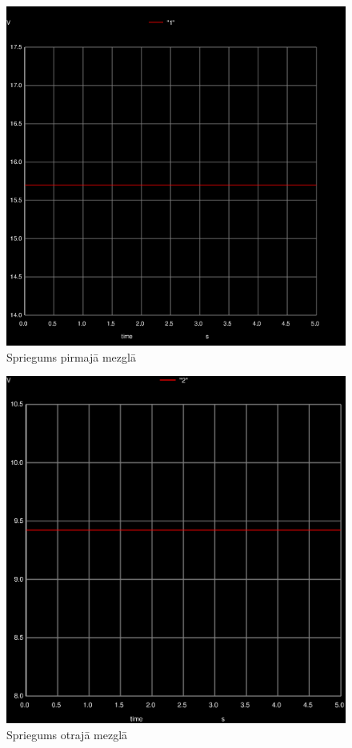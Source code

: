 \documentclass{report}
\begin{document}
\begin{figure}[h]
    \centering
    \includegraphics[scale=0.3]{011.png}
    \caption{Spriegums pirmajā mezglā}
    \label{att2}
\end{figure}


\begin{figure}[h]
    \centering
    \includegraphics[scale=0.3]{012.ps}
    \caption{Spriegums otrajā mezglā}
    \label{att3}
\end{figure}
\end{document}
